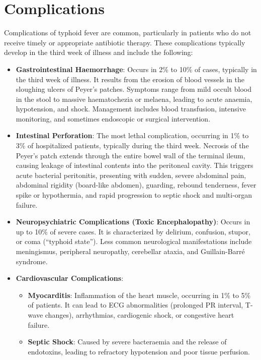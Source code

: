 \section*{Complications}
Complications of typhoid fever are common, particularly in patients who do not receive timely or appropriate antibiotic therapy. These complications typically develop in the third week of illness and include the following:
\begin{itemize}
  \item \textbf{Gastrointestinal Haemorrhage}: Occurs in 2\% to 10\% of cases, typically in the third week of illness. It results from the erosion of blood vessels in the sloughing ulcers of Peyer's patches. Symptoms range from mild occult blood in the stool to massive haematochezia or melaena, leading to acute anaemia, hypotension, and shock. Management includes blood transfusion, intensive monitoring, and sometimes endoscopic or surgical intervention.
  \item \textbf{Intestinal Perforation}: The most lethal complication, occurring in 1\% to 3\% of hospitalized patients, typically during the third week. Necrosis of the Peyer's patch extends through the entire bowel wall of the terminal ileum, causing leakage of intestinal contents into the peritoneal cavity. This triggers acute bacterial peritonitis, presenting with sudden, severe abdominal pain, abdominal rigidity (board-like abdomen), guarding, rebound tenderness, fever spike or hypothermia, and rapid progression to septic shock and multi-organ failure.
  \item \textbf{Neuropsychiatric Complications (Toxic Encephalopathy)}: Occurs in up to 10\% of severe cases. It is characterized by delirium, confusion, stupor, or coma (``typhoid state''). Less common neurological manifestations include meningismus, peripheral neuropathy, cerebellar ataxia, and Guillain-Barré syndrome.
  \item \textbf{Cardiovascular Complications}:
  \begin{itemize}
    \item \textbf{Myocarditis}: Inflammation of the heart muscle, occurring in 1\% to 5\% of patients. It can lead to ECG abnormalities (prolonged PR interval, T-wave changes), arrhythmias, cardiogenic shock, or congestive heart failure.
    \item \textbf{Septic Shock}: Caused by severe bacteraemia and the release of endotoxins, leading to refractory hypotension and poor tissue perfusion.
  \end{itemize}

\end{itemize}
